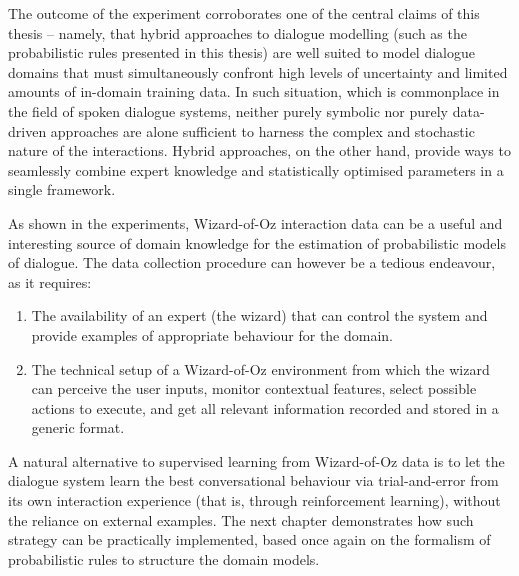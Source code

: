 The outcome of the experiment corroborates one of the central claims of this thesis -- namely, that hybrid approaches to dialogue modelling (such as the probabilistic rules presented in this thesis) are well suited to model dialogue domains that must simultaneously confront high levels of uncertainty and limited amounts of in-domain training data.  In such situation, which is commonplace in the field of spoken dialogue systems, neither purely symbolic nor purely data-driven approaches are alone sufficient to harness the complex and stochastic nature of the interactions.  Hybrid approaches, on the other hand, provide ways to seamlessly combine expert knowledge and statistically optimised parameters in a single framework. 

As shown in the experiments, Wizard-of-Oz interaction data can be a useful and interesting source of domain knowledge for the estimation of probabilistic models of dialogue. The data collection procedure can however be a tedious endeavour, as it requires:
\begin{enumerate}
\item The availability of an expert (the wizard) that can control the system and provide examples of appropriate behaviour for the domain.
\item The technical setup of a Wizard-of-Oz environment from which the wizard can perceive the user inputs, monitor contextual features, select possible actions to execute, and get all relevant information recorded and stored in a generic format. 
\end{enumerate}

A natural alternative to supervised learning from Wizard-of-Oz data is to let the dialogue system learn the best conversational behaviour via trial-and-error from its own interaction experience (that is, through reinforcement learning), without the reliance on external examples.  The next chapter demonstrates how such strategy can be practically implemented, based once again on the formalism of probabilistic rules to structure the domain models. 
